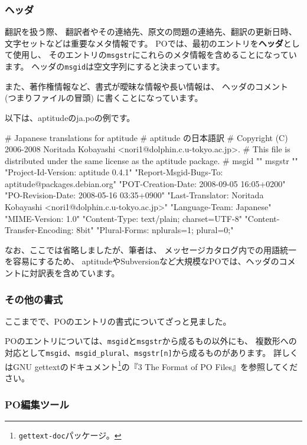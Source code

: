 \documentclass[mingoth,a4paper]{jsarticle}
\begin{document}
\subsubsection{ヘッダ}

翻訳を扱う際、
翻訳者やその連絡先、原文の問題の連絡先、翻訳の更新日時、文字セットなどは重要なメタ情報です。
POでは、最初のエントリを{\bf ヘッダ}として使用し、
そのエントリの\texttt{msgstr}にこれらのメタ情報を含めることになっています。
ヘッダの\texttt{msgid}は空文字列にすると決まっています。

また、著作権情報など、書式が曖昧な情報や長い情報は、
ヘッダのコメント (つまりファイルの冒頭) に書くことになっています。

以下は、aptitudeのja.poの例です。

\begin{commandline}
# Japanese translations for aptitude
# aptitude の日本語訳
# Copyright (C) 2006-2008 Noritada Kobayashi <nori1@dolphin.c.u-tokyo.ac.jp>.
# This file is distributed under the same license as the aptitude package.
#
msgid ""
msgstr ""
"Project-Id-Version: aptitude 0.4.1\n"
"Report-Msgid-Bugs-To: aptitude@packages.debian.org\n"
"POT-Creation-Date: 2008-09-05 16:05+0200\n"
"PO-Revision-Date: 2008-05-16 03:35+0900\n"
"Last-Translator: Noritada Kobayashi <nori1@dolphin.c.u-tokyo.ac.jp>\n"
"Language-Team: Japanese\n"
"MIME-Version: 1.0\n"
"Content-Type: text/plain; charset=UTF-8\n"
"Content-Transfer-Encoding: 8bit\n"
"Plural-Forms: nplurals=1; plural=0;\n"
\end{commandline}

なお、ここでは省略しましたが、筆者は、
メッセージカタログ内での用語統一を容易にするため、
aptitudeやSubversionなど大規模なPOでは、ヘッダのコメントに対訳表を含めています。

\subsubsection{その他の書式}

ここまでで、POのエントリの書式についてざっと見ました。

POのエントリについては、\texttt{msgid}と\texttt{msgstr}から成るもの以外にも、
複数形への対応として\texttt{msgid}、\texttt{msgid\_plural}、\texttt{msgstr[n]}から成るものがあります。
詳しくはGNU gettextのドキュメント\footnote{\texttt{gettext-doc}パッケージ。}の『3 The Format of PO Files』を参照してください。

\subsubsection{PO編集ツール}
\end{document}
